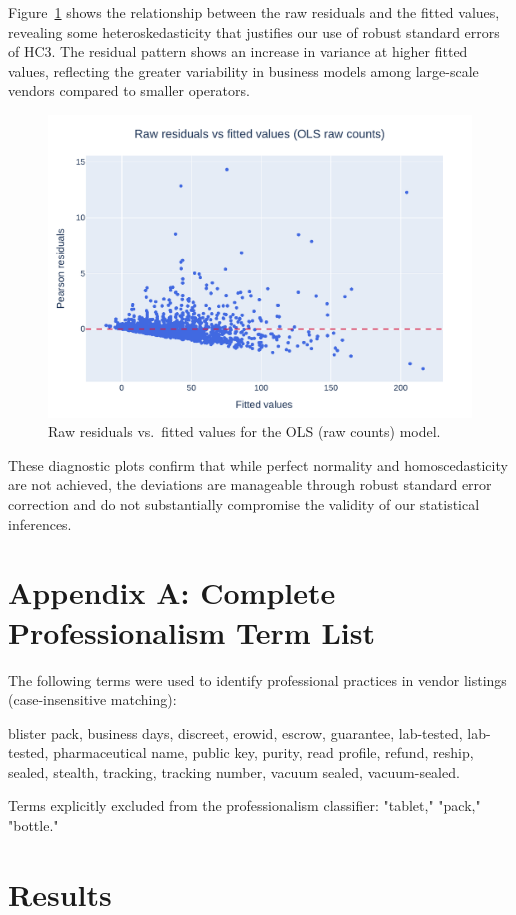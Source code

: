 \documentclass{article}
\begin{document}
Figure~\ref{fig:resid_fitted} shows the relationship between the raw residuals and the fitted values, revealing some heteroskedasticity that justifies our use of robust standard errors of HC3. The residual pattern shows an increase in variance at higher fitted values, reflecting the greater variability in business models among large-scale vendors compared to smaller operators.

\begin{figure}[ht]
  \centering
  \includegraphics[width=.6\textwidth]{resid_vs_fitted_rawols.pdf}
  \caption{Raw residuals vs.\ fitted values for the OLS (raw counts) model.}
  \label{fig:resid_fitted}
\end{figure}

These diagnostic plots confirm that while perfect normality and homoscedasticity are not achieved, the deviations are manageable through robust standard error correction and do not substantially compromise the validity of our statistical inferences.

\section*{Appendix A: Complete Professionalism Term List}

The following terms were used to identify professional practices in vendor listings (case-insensitive matching):

blister pack, business days, discreet, erowid, escrow, guarantee, lab-tested, lab-tested, pharmaceutical name, public key, purity, read profile, refund, reship, sealed, stealth, tracking, tracking number, vacuum sealed, vacuum-sealed.

Terms explicitly excluded from the professionalism classifier: "tablet," "pack," "bottle."

\section{Results}\label{sec:results}
\end{document}
